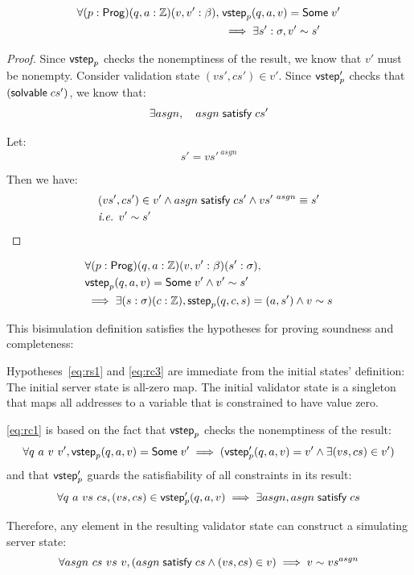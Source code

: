 \begin{lemma}[\ref{eq:rc1}]
\begin{align*}
\forall(p:\mathsf{Prog})(q,a:\mathbb Z)(v,v':\beta),\;&\mathsf{vstep}_p(q,a,v)=\mathsf{Some}\;v'\\
&\implies\exists s':\sigma,v'\sim s'
\end{align*}
\begin{proof}
Since $\mathsf{vstep}_p$ checks the nonemptiness of the result, we know that $v'$ must
be nonempty.  Consider validation state $(vs',cs')\in v'$.  Since $\mathsf{vstep}_p'$
checks that $(\mathsf{solvable}\; cs')$, we know that:
\[\exists asgn,\quad asgn\;\mathsf{satisfy}\;cs'\]

Let:
\[s'=vs'^{~asgn}\]

Then we have:
\begin{align*}
&(vs',cs')\in v'\wedge asgn\;\mathsf{satisfy}\;cs'\wedge vs'^{~asgn}\equiv s'\\
&\textit{i.e. }v'\sim s'
\end{align*}
\end{proof}
\end{lemma}

\begin{lemma}[\ref{eq:rc2}]
\begin{align*}
&\forall(p:\mathsf{Prog})(q,a:\mathbb Z)(v,v':\beta)(s':\sigma),\\
&\mathsf{vstep}_p(q,a,v)=\mathsf{Some}\;v'\wedge v'\sim s'\\
&\implies\exists(s:\sigma)(c:\mathbb Z),\mathsf{sstep}_p(q,c,s)=(a,s')\wedge v\sim s
\end{align*}
\end{lemma}

This bisimulation definition satisfies the hypotheses for proving soundness and
completeness:

Hypotheses~\ref{eq:rs1} and \ref{eq:rc3} are immediate from the initial states'
definition: The initial server state is all-zero map.  The initial validator
state is a singleton that maps all addresses to a variable that is constrained
to have value zero.

\autoref{eq:rc1} is based on the fact that $\mathsf{vstep}_p$ checks the nonemptiness of
the result:
\[\forall q~a~v~v',\mathsf{vstep}_p(q,a,v)=\mathsf{Some}\;v'\implies(\mathsf{vstep}_p'(q,a,v)=v'\wedge\exists (vs,cs)\in v')\]
and that $\mathsf{vstep}_p'$ guards the satisfiability of all constraints in its result:
\[\forall q~a~vs~cs,{(vs,cs)}\in\mathsf{vstep}_p'(q,a,v)\implies\exists asgn,asgn\;\mathsf{satisfy}\;cs\]

Therefore, any element in the resulting validator state can construct a
simulating server state:
\[\forall asgn~cs~vs~v,(asgn\;\mathsf{satisfy}\;cs\wedge(vs,cs)\in v)\implies v\sim vs^{asgn}\]

